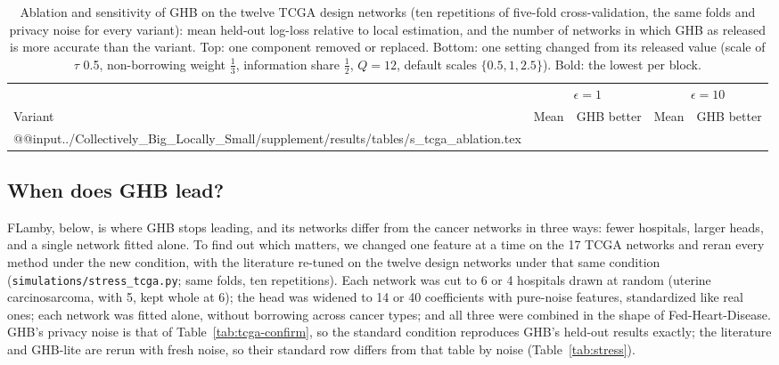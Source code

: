 \begin{table}[t]
\caption{Ablation and sensitivity of GHB on the twelve TCGA design networks (ten repetitions of five-fold cross-validation, the same folds and privacy noise for every variant): mean held-out log-loss relative to local estimation, and the number of networks in which GHB as released is more accurate than the variant. Top: one component removed or replaced. Bottom: one setting changed from its released value (scale of $\tau$ 0.5, non-borrowing weight $\frac13$, information share $\frac12$, $Q=12$, default scales $\{0.5,1,2.5\}$). Bold: the lowest per block.}
\label{tab:tcga-ablation}
\scriptsize
\begin{tabular}{@{}lrrrr@{}}
\toprule
 & \multicolumn{2}{c}{$\epsilon=1$} & \multicolumn{2}{c}{$\epsilon=10$}\\
\cmidrule(lr){2-3}\cmidrule(l){4-5}
Variant & Mean & GHB better & Mean & GHB better\\
\midrule
\csname @@input\endcsname../Collectively_Big_Locally_Small/supplement/results/tables/s_tcga_ablation.tex 
\bottomrule
\end{tabular}
\end{table}

\subsection{When does GHB lead?}\label{sec:real-stress}

FLamby, below, is where GHB stops leading, and its networks differ from the cancer networks in three ways: fewer hospitals, larger heads, and a single network fitted alone. To find out which matters, we changed one feature at a time on the 17 TCGA networks and reran every method under the new condition, with the literature re-tuned on the twelve design networks under that same condition (\texttt{simulations/stress\_tcga.py}; same folds, ten repetitions). Each network was cut to 6 or 4 hospitals drawn at random (uterine carcinosarcoma, with 5, kept whole at 6); the head was widened to 14 or 40 coefficients with pure-noise features, standardized like real ones; each network was fitted alone, without borrowing across cancer types; and all three were combined in the shape of Fed-Heart-Disease. GHB's privacy noise is that of Table~\ref{tab:tcga-confirm}, so the standard condition reproduces GHB's held-out results exactly; the literature and GHB-lite are rerun with fresh noise, so their standard row differs from that table by noise (Table~\ref{tab:stress}).

